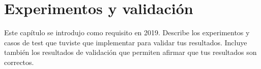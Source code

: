 
\cleardoublepage
\chapter{Experimentos y validación}
\label{chap:experimentos}

Este capítulo se introdujo como requisito en 2019. 
Describe los experimentos y casos de test que tuviste que implementar para validar tus resultados. 
Incluye también los resultados de validación que permiten afirmar que tus resultados son correctos. 


